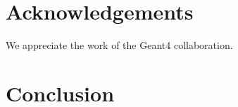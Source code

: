 \section{Acknowledgements}

We appreciate the work of the Geant4 collaboration.

\section{Conclusion}



